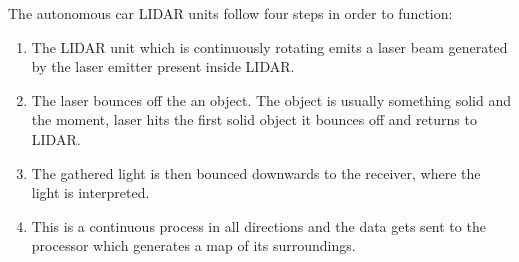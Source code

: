 The autonomous car LIDAR units follow four steps in order to function:
\begin{enumerate}
	\item The LIDAR unit which is continuously rotating emits a laser beam generated by the laser emitter present inside LIDAR.
	\item The laser bounces off the an object. The object is usually something solid and the moment, laser hits the first solid object it bounces off and returns to LIDAR.
	\item The gathered light is then bounced downwards to the receiver, where the light is interpreted. 
	\item This is a continuous process in all directions and the data gets sent to the processor which generates a map of its surroundings.
\end{enumerate}